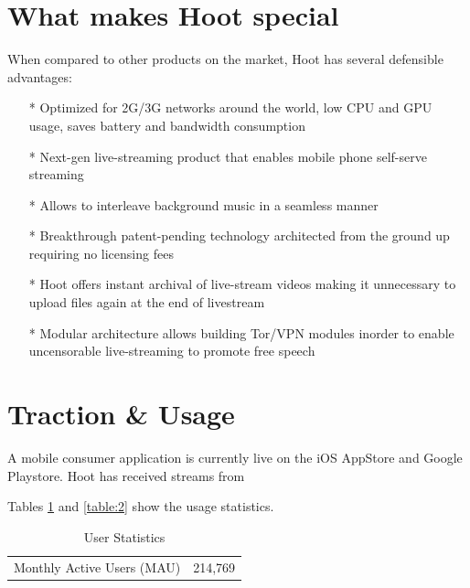 \documentclass{article}
\begin{document}
\section{What makes Hoot special}
When compared to other products on the market, Hoot has several defensible advantages:
\begin{itemize}
\item[*]Optimized for 2G/3G networks around the world, low CPU and GPU usage, saves battery and bandwidth consumption
\item[*]Next-gen live-streaming product that enables mobile phone self-serve streaming 
\item[*]Allows to interleave background music in a seamless manner
\item[*]Breakthrough patent-pending technology architected from the ground up requiring no licensing fees
\item[*]Hoot offers instant archival of live-stream videos making it unnecessary to upload files again at the end of livestream
\item[*]Modular architecture allows building Tor/VPN modules inorder to enable uncensorable live-streaming to promote free speech
\end{itemize}


\section{Traction \& Usage}
A mobile consumer application is currently live on the iOS AppStore and Google Playstore. Hoot has received streams from 


Tables \ref{table:1} and \ref{table:2} show the usage statistics.

\setlength{\arrayrulewidth}{.7mm}
\setlength{\tabcolsep}{18pt}
\renewcommand{\arraystretch}{2.0} 
 


\begin{table}[!htb]
\centering
\begin{tabular}{ |c|c| }
\hline
\rowcolor{lightgray} \multicolumn{2}{|c|}{User Statistics} \\
\hline
Monthly Active Users (MAU) & 214,769 \\
\hline
\end{tabular}
\caption{User Statistics}
\label{table:1}
\end{table}
\end{document}
